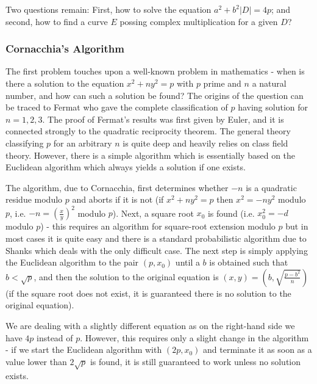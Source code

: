 \documentclass[11pt,english]{article}
\begin{document}
Two questions remain: First, how to solve the equation $a^2+b^2|D|=4p$; and second, how to find a curve $E$ possing complex multiplication for
a given $D$?

\subsubsection{Cornacchia's Algorithm}
The first problem touches upon a well-known problem in mathematics - when is there a solution to the equation $x^2+ny^2=p$ with $p$ prime and
$n$ a natural number, and how can such a solution be found? The origins of the question can be traced to Fermat who gave the complete classification of
$p$ having solution for $n=1,2,3$. The proof of Fermat's results was first given by Euler, and it is connected strongly to the quadratic reciprocity theorem.
The general theory classifying $p$ for an arbitrary $n$ is quite deep and heavily relies on class field theory. However, there is a simple algorithm which
is essentially based on the Euclidean algorithm which always yields a solution if one exists.

The algorithm, due to Cornacchia, first determines whether $-n$ is a quadratic residue modulo $p$ and aborts if it is not (if $x^2+ny^2=p$ then $x^2=-ny^2$ modulo $p$,
i.e. $-n=\left(\frac{x}{y}\right)^2$ modulo $p$). Next, a square root $x_0$ is found (i.e. $x_0^2=-d$ modulo $p$) - this requires an algorithm for square-root
extension modulo $p$ but in most cases it is quite easy and there is a standard probabilistic algorithm due to Shanks which deals with the only difficult case.
The next step is simply applying the Euclidean algorithm to the pair $(p,x_0)$ until a $b$ is obtained such that $b<\sqrt{p}$, and then the solution to the original equation
is $(x,y)=\left(b,\sqrt{\frac{p-b^2}{n}}\right)$ (if the square root does not exist, it is guaranteed there is no solution to the original equation).

We are dealing with a slightly different equation as on the right-hand side we have $4p$ instead of $p$. However, this requires only a slight change in
the algorithm - if we start the Euclidean algorithm with $(2p,x_0)$ and terminate it as soon as a value lower than $2\sqrt{p}$ is found, it is still guaranteed
to work unless no solution exists.
\end{document}
